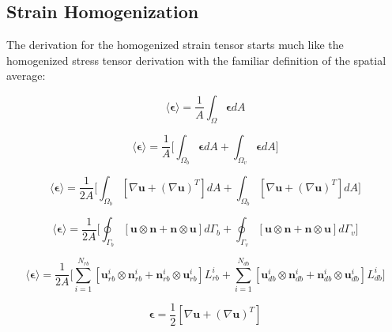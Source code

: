\subsection{Strain Homogenization}
The derivation for the homogenized strain tensor starts much like the homogenized stress tensor derivation with the familiar definition of the spatial average:

\begin{equation}
\label{eqn:strain2}
\langle \boldsymbol{\epsilon} \rangle = 
\frac{1}{A} \int_\Omega \boldsymbol{\epsilon} {dA}
\end{equation}

\begin{equation}
\label{eqn:strain3}
\langle \boldsymbol{\epsilon} \rangle = 
\frac{1}{A} \bigg \lbrack {\int_{\Omega_{b}} \boldsymbol{\epsilon} { dA} + 
\int_{\Omega_{v}} \boldsymbol{\epsilon} {dA}} \bigg \rbrack
\end{equation}

\begin{equation}
\label{eqn:strain4}
\langle \boldsymbol{\epsilon} \rangle = 
\frac{1}{2 A} \bigg \lbrack {\int_{\Omega_{b}} \left[ \nabla \mathbf{u} + 
\left( \nabla \mathbf{u} \right)^{T} \right] {dA} +
\int_{\Omega_{b}} \left[ \nabla \mathbf{u} + 
\left( \nabla \mathbf{u} \right)^{T} \right] {dA}} \bigg \rbrack
\end{equation}

\begin{equation}
\label{eqn:strain5}
\langle \boldsymbol{\epsilon} \rangle = 
\frac{1}{2 A} \bigg \lbrack {\oint_{\Gamma_{b}} \left[ \mathbf{u} \otimes \mathbf{n} + 
\mathbf{n} \otimes \mathbf{u} \right] {d \Gamma_b} +
\oint_{\Gamma_{v}} \left[ \mathbf{u} \otimes \mathbf{n} + 
\mathbf{n} \otimes \mathbf{u} \right] { d \Gamma_v}} \bigg \rbrack
\end{equation}

\begin{equation}
\label{eqn:strain6}
\langle \boldsymbol{\epsilon} \rangle = 
\frac{1}{2 A} \bigg \lbrack {\sum_{i=1}^{N_{rb}} \left[ \mathbf{u}_{rb}^i \otimes \mathbf{n}_{rb}^i + 
\mathbf{n}_{rb}^i \otimes \mathbf{u}_{rb}^i \right] {L_{rb}^i} +
\sum_{i=1}^{N_{db}} \left[ \mathbf{u}_{db}^i \otimes \mathbf{n}_{db}^i + 
\mathbf{n}_{db}^i \otimes \mathbf{u}_{db}^i \right] {L_{db}^i}} \bigg \rbrack
\end{equation}






\begin{equation}
\label{eqn:strain1}
\boldsymbol{\epsilon} = 
\frac{1}{2}  \left[ \nabla \mathbf{u} + \left( \nabla \mathbf{u} \right)^{T} \right]
\end{equation}